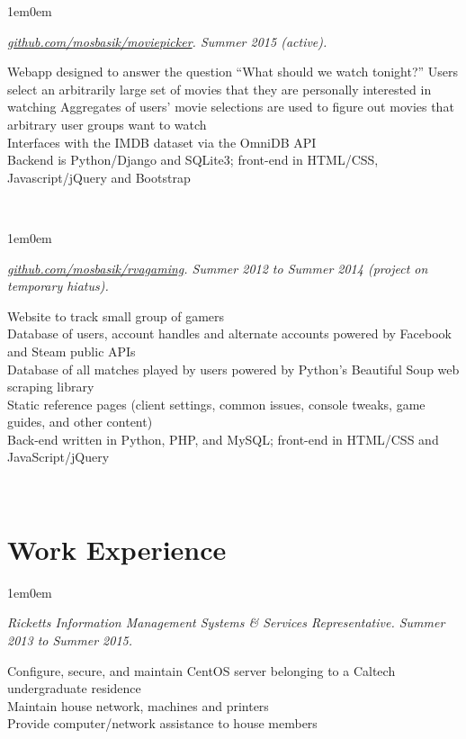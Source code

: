 \documentclass[10pt,letterpaper, full]{article}
\newcommand{\pjtitle}[1]{\renewcommand{\givenpjtitle}{#1}}
\newcommand{\pjtime}[1]{\renewcommand{\givenpjtime}{#1}}
\newcommand{\pjbody}[1]{\renewcommand{\givenpjbody}{#1}}
\newcommand{\givenpjtitle}{REQUIRED!}
\newcommand{\givenpjtime}{REQUIRED!}
\newcommand{\givenpjbody}{REQUIRED!}
\newenvironment{projectenv}
    {
        \begin{adjustwidth}{1em}{0em}
    }
    {
        \textit{\givenpjtitle. \givenpjtime.}

        \begin{minipage}[l]{\textwidth}
            \givenpjbody%
        \end{minipage}\\%


        \end{adjustwidth}
    }
\begin{document}
\begin{projectenv}
    \pjtitle{\href{https://github.com/mosbasik/moviepicker}{github.com/mosbasik/moviepicker}}
    \pjtime{Summer 2015 (active)}
    \pjbody{
        Webapp designed to answer the question “What should we watch
        tonight?”
        Users select an arbitrarily large set of movies that they are
        personally interested in watching
        Aggregates of users’ movie selections are used to figure out movies
        that arbitrary user groups want to watch\\
        Interfaces with the IMDB dataset via the OmniDB API\\
        Backend is Python/Django and SQLite3; front-end in HTML/CSS,
        Javascript/jQuery and Bootstrap\\
    }%
\end{projectenv}%

\begin{projectenv}%
    \pjtitle{\href{https://github.com/mosbasik/rvagaming}{github.com/mosbasik/rvagaming}}
    \pjtime{Summer 2012 to Summer 2014 (project on temporary hiatus)}
    \pjbody{
        Website to track small group of gamers\\
        Database of users, account handles and alternate accounts powered by
        Facebook and Steam public APIs\\
        Database of all matches played by users powered by Python’s Beautiful
        Soup web scraping library\\
        Static reference pages (client settings, common issues, console tweaks,
        game guides, and other content)\\
        Back-end written in Python, PHP, and MySQL; front-end in HTML/CSS and
        JavaScript/jQuery
    }%
\end{projectenv}%

\section{Work Experience}
\begin{projectenv}%
    \pjtitle{Ricketts Information Management Systems \& Services Representative}
    \pjtime{Summer 2013 to Summer 2015}
    \pjbody{
        Configure, secure, and maintain CentOS server belonging to a Caltech
        undergraduate residence\\
        Maintain house network, machines and printers\\
        Provide computer/network assistance to house members\\
    }
\end{projectenv}%
\end{document}
